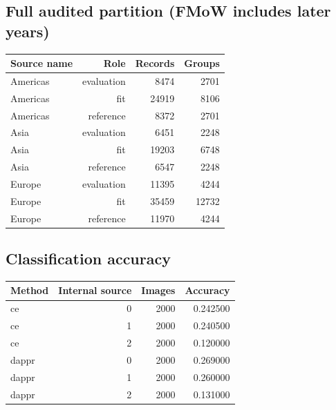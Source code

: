 \reservetable
\subsection{Full audited partition (FMoW includes later years)}

\begingroup\small
\setlength{\tabcolsep}{4pt}
\begin{longtable}{lrrr}
\toprule

Source name & Role & Records & Groups\\\midrule\endhead

Americas & evaluation & 8474 & 2701\\

Americas & fit & 24919 & 8106\\

Americas & reference & 8372 & 2701\\

Asia & evaluation & 6451 & 2248\\

Asia & fit & 19203 & 6748\\

Asia & reference & 6547 & 2248\\

Europe & evaluation & 11395 & 4244\\

Europe & fit & 35459 & 12732\\

Europe & reference & 11970 & 4244\\

\bottomrule
\end{longtable}
\endgroup

\reservetable
\subsection{Classification accuracy}

\begingroup\small
\setlength{\tabcolsep}{4pt}
\begin{longtable}{lrrr}
\toprule

Method & Internal source & Images & Accuracy\\\midrule\endhead

ce & 0 & 2000 & 0.242500\\

ce & 1 & 2000 & 0.240500\\

ce & 2 & 2000 & 0.120000\\

dappr & 0 & 2000 & 0.269000\\

dappr & 1 & 2000 & 0.260000\\

dappr & 2 & 2000 & 0.131000\\

\bottomrule
\end{longtable}
\endgroup

